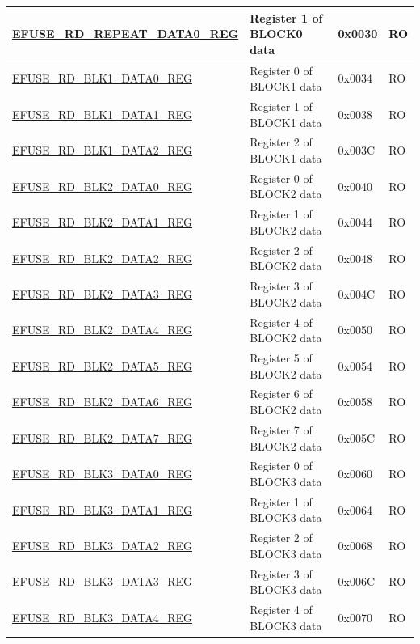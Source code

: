 \begin{longtable}{ | p{6cm} | p{7.2cm} | p{1.3cm} | p{1.5cm} | }
\hyperref[regdesc:EFUSERDREPEATDATA0REG]{EFUSE\_RD\_REPEAT\_DATA0\_REG} & Register 1 of BLOCK0 data & 0x0030 & RO \\ \hline
\hyperref[regdesc:EFUSERDBLK1DATA0REG]{EFUSE\_RD\_BLK1\_DATA0\_REG} & Register 0 of BLOCK1 data & 0x0034 & RO \\ \hline
\hyperref[regdesc:EFUSERDBLK1DATA1REG]{EFUSE\_RD\_BLK1\_DATA1\_REG} & Register 1 of BLOCK1 data & 0x0038 & RO \\ \hline
\hyperref[regdesc:EFUSERDBLK1DATA2REG]{EFUSE\_RD\_BLK1\_DATA2\_REG} & Register 2 of BLOCK1 data & 0x003C & RO \\ \hline
\hyperref[regdesc:EFUSERDBLK2DATA0REG]{EFUSE\_RD\_BLK2\_DATA0\_REG} & Register 0 of BLOCK2 data & 0x0040 & RO \\ \hline
\hyperref[regdesc:EFUSERDBLK2DATA1REG]{EFUSE\_RD\_BLK2\_DATA1\_REG} & Register 1 of BLOCK2 data & 0x0044 & RO \\ \hline
\hyperref[regdesc:EFUSERDBLK2DATA2REG]{EFUSE\_RD\_BLK2\_DATA2\_REG} & Register 2 of BLOCK2 data & 0x0048 & RO \\ \hline
\hyperref[regdesc:EFUSERDBLK2DATA3REG]{EFUSE\_RD\_BLK2\_DATA3\_REG} & Register 3 of BLOCK2 data & 0x004C & RO \\ \hline
\hyperref[regdesc:EFUSERDBLK2DATA4REG]{EFUSE\_RD\_BLK2\_DATA4\_REG} & Register 4 of BLOCK2 data & 0x0050 & RO \\ \hline
\hyperref[regdesc:EFUSERDBLK2DATA5REG]{EFUSE\_RD\_BLK2\_DATA5\_REG} & Register 5 of BLOCK2 data & 0x0054 & RO \\ \hline
\hyperref[regdesc:EFUSERDBLK2DATA6REG]{EFUSE\_RD\_BLK2\_DATA6\_REG} & Register 6 of BLOCK2 data & 0x0058 & RO \\ \hline
\hyperref[regdesc:EFUSERDBLK2DATA7REG]{EFUSE\_RD\_BLK2\_DATA7\_REG} & Register 7 of BLOCK2 data & 0x005C & RO \\ \hline
\hyperref[regdesc:EFUSERDBLK3DATA0REG]{EFUSE\_RD\_BLK3\_DATA0\_REG} & Register 0 of BLOCK3 data & 0x0060 & RO \\ \hline
\hyperref[regdesc:EFUSERDBLK3DATA1REG]{EFUSE\_RD\_BLK3\_DATA1\_REG} & Register 1 of BLOCK3 data & 0x0064 & RO \\ \hline
\hyperref[regdesc:EFUSERDBLK3DATA2REG]{EFUSE\_RD\_BLK3\_DATA2\_REG} & Register 2 of BLOCK3 data & 0x0068 & RO \\ \hline
\hyperref[regdesc:EFUSERDBLK3DATA3REG]{EFUSE\_RD\_BLK3\_DATA3\_REG} & Register 3 of BLOCK3 data & 0x006C & RO \\ \hline
\hyperref[regdesc:EFUSERDBLK3DATA4REG]{EFUSE\_RD\_BLK3\_DATA4\_REG} & Register 4 of BLOCK3 data & 0x0070 & RO \\ \hline

\end{longtable}
